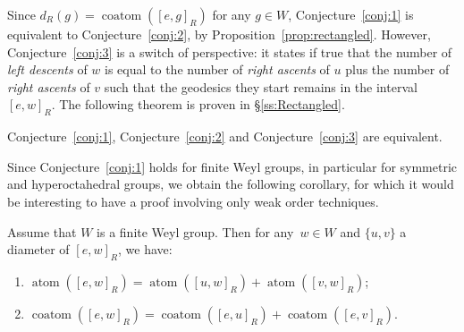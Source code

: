 \documentclass[Unicode]{cedram-alco}
\theoremstyle{definition}
\newcommand{\coatom}{\operatorname{coatom}}
\newcommand{\atom}{\operatorname{atom}}
\begin{document}
Since $d_R(g)=\coatom([e,g]_R)$ for any $g\in W$, Conjecture~\ref{conj:1} is equivalent to Conjecture~\ref{conj:2}, by Proposition~\ref{prop:rectangled}. However, Conjecture~\ref{conj:3} is a switch of perspective: it states if true that the number of {\em left descents} of $w$ is equal to the number of {\em right ascents} of $u$ plus the number of {\em right ascents} of $v$ such that the geodesics they start remains in the interval $[e,w]_R$. The following theorem is proven in \S\ref{ss:Rectangled}.

\begin{thm}\label{thm:Equivalent} Conjecture~\ref{conj:1}, Conjecture~\ref{conj:2} and Conjecture~\ref{conj:3} are equivalent. 
\end{thm}

Since Conjecture~\ref{conj:1} holds for finite Weyl groups, in particular for symmetric and hyperoctahedral groups,  we obtain the following corollary, for which it would be interesting to have a proof involving only weak order techniques.

\begin{coro} Assume that $W$ is a finite Weyl group. Then for any~$w\in  W$ and $\{u,v\}$ a  diameter of $[e,w]_R$, we have:
\begin{enumerate}
\item $\atom([e,w]_R)= \atom([u,w]_R) + \atom([v,w]_R)$;
\item $\coatom([e,w]_R)= \coatom([e,u]_R) + \coatom([e,v]_R)$.
\end{enumerate}
\end{coro}
\end{document}
